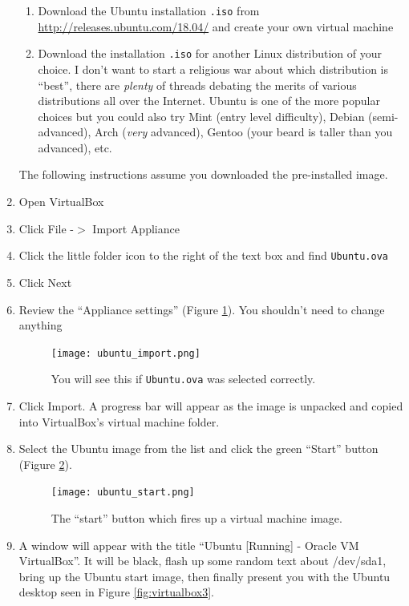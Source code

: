 \documentclass{lab}
\begin{document}
\begin{enumerate}
\begin{enumerate}
		\item Download the Ubuntu installation \texttt{.iso} from \url{http://releases.ubuntu.com/18.04/} and create your own virtual machine
		\item Download the installation \texttt{.iso} for another Linux distribution of your choice. I don't want to start a religious war about which distribution is ``best'', there are \textit{plenty} of threads debating the merits of various distributions all over the Internet. Ubuntu is one of the more popular choices but you could also try Mint (entry level difficulty), Debian (semi-advanced), Arch (\textit{very} advanced), Gentoo (your beard is taller than you advanced), etc.
	\end{enumerate}
	\pagebreak
	The following instructions assume you downloaded the pre-installed image.
\item Open VirtualBox
\item Click File -$>$ Import Appliance
\item Click the little folder icon to the right of the text box and find \texttt{Ubuntu.ova}
\item Click Next
\item Review the ``Appliance settings'' (Figure \ref{fig:virtualbox1}). You shouldn't need to change anything

\begin{figure}[H]
\begin{center}
\texttt{[image: ubuntu\_import.png]}
\end{center}
\caption{You will see this if \texttt{Ubuntu.ova} was selected correctly.}\label{fig:virtualbox1}
\end{figure}

\item Click Import. A progress bar will appear as the image is unpacked and copied into VirtualBox's virtual machine folder.

\item Select the Ubuntu image from the list and click the green ``Start'' button (Figure \ref{fig:virtualbox2}).
\begin{figure}[H]
\begin{center}
\texttt{[image: ubuntu\_start.png]}
\end{center}
\caption{The ``start'' button which fires up a virtual machine image.}\label{fig:virtualbox2}
\end{figure}

\item A window will appear with the title ``Ubuntu [Running] - Oracle VM VirtualBox''. It will be black, flash up some random text about /dev/sda1, bring up the Ubuntu start image, then finally present you with the Ubuntu desktop seen in Figure \ref{fig:virtualbox3}.


\end{enumerate}
\end{document}
